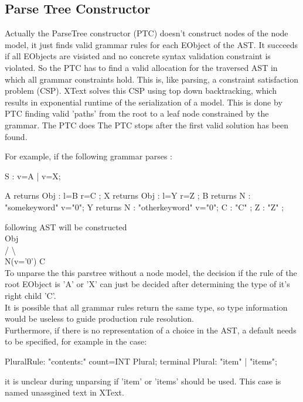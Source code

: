 \subsection{Parse Tree Constructor}
Actually the ParseTree constructor (PTC) doesn't construct nodes of the node model, it just finds valid grammar rules for each EObject of the AST. It succeeds if all EObjects are visisted and no concrete syntax validation constraint is violated. So the PTC has to find a valid allocation for the traversed AST in which all grammar constraints hold.  This is, like parsing, a constraint satisfaction problem (CSP). XText solves this CSP  using top down backtracking, which results in exponential runtime of the serialization of a model. This is done by PTC finding valid 'paths' from the root to a leaf node constrained by the grammar. The PTC does The PTC stops after the first valid solution has been found. 

For example, if the following grammar parses :
\begin{xtxt}
S  	:  	v=A 
	| 	v=X;

A returns Obj	: 	l=B r=C   ;
X returns Obj	: 	l=Y r=Z   ;
B returns N  	:  	"somekeyword" 	v="0";
Y returns N  	: 	"otherkeyword" 	v="0";
C 			:  	 "C" ;
Z 			: 	 "Z" ;
\end{xtxt}
following AST will be constructed  \\ 
      Obj			\\
     /   \textbackslash		\\
N(v='0')   C	\\
To unparse the this parstree without a node model, the decision if the rule of the root EObject is 'A' or 'X' can just be decided after determining the type of it's right child 'C'. \\

It is possible that all grammar rules return the same type, so type information would be useless to guide production rule resolution.\\
Furthermore, if there is no representation of a choice in the AST, a default needs to be specified, for example in the case: 
\begin{xtxt}
PluralRule: "contents:" count=INT Plural;
terminal Plural: "item" | "items";
\end{xtxt}
it is unclear during unparsing if 'item' or 'items' should be used. This case is named unassgined text in XText.

